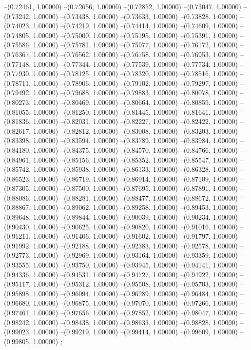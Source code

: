 --(0.72461, 1.00000)
--(0.72656, 1.00000)
--(0.72852, 1.00000)
--(0.73047, 1.00000)
--(0.73242, 1.00000)
--(0.73438, 1.00000)
--(0.73633, 1.00000)
--(0.73828, 1.00000)
--(0.74023, 1.00000)
--(0.74219, 1.00000)
--(0.74414, 1.00000)
--(0.74609, 1.00000)
--(0.74805, 1.00000)
--(0.75000, 1.00000)
--(0.75195, 1.00000)
--(0.75391, 1.00000)
--(0.75586, 1.00000)
--(0.75781, 1.00000)
--(0.75977, 1.00000)
--(0.76172, 1.00000)
--(0.76367, 1.00000)
--(0.76562, 1.00000)
--(0.76758, 1.00000)
--(0.76953, 1.00000)
--(0.77148, 1.00000)
--(0.77344, 1.00000)
--(0.77539, 1.00000)
--(0.77734, 1.00000)
--(0.77930, 1.00000)
--(0.78125, 1.00000)
--(0.78320, 1.00000)
--(0.78516, 1.00000)
--(0.78711, 1.00000)
--(0.78906, 1.00000)
--(0.79102, 1.00000)
--(0.79297, 1.00000)
--(0.79492, 1.00000)
--(0.79688, 1.00000)
--(0.79883, 1.00000)
--(0.80078, 1.00000)
--(0.80273, 1.00000)
--(0.80469, 1.00000)
--(0.80664, 1.00000)
--(0.80859, 1.00000)
--(0.81055, 1.00000)
--(0.81250, 1.00000)
--(0.81445, 1.00000)
--(0.81641, 1.00000)
--(0.81836, 1.00000)
--(0.82031, 1.00000)
--(0.82227, 1.00000)
--(0.82422, 1.00000)
--(0.82617, 1.00000)
--(0.82812, 1.00000)
--(0.83008, 1.00000)
--(0.83203, 1.00000)
--(0.83398, 1.00000)
--(0.83594, 1.00000)
--(0.83789, 1.00000)
--(0.83984, 1.00000)
--(0.84180, 1.00000)
--(0.84375, 1.00000)
--(0.84570, 1.00000)
--(0.84766, 1.00000)
--(0.84961, 1.00000)
--(0.85156, 1.00000)
--(0.85352, 1.00000)
--(0.85547, 1.00000)
--(0.85742, 1.00000)
--(0.85938, 1.00000)
--(0.86133, 1.00000)
--(0.86328, 1.00000)
--(0.86523, 1.00000)
--(0.86719, 1.00000)
--(0.86914, 1.00000)
--(0.87109, 1.00000)
--(0.87305, 1.00000)
--(0.87500, 1.00000)
--(0.87695, 1.00000)
--(0.87891, 1.00000)
--(0.88086, 1.00000)
--(0.88281, 1.00000)
--(0.88477, 1.00000)
--(0.88672, 1.00000)
--(0.88867, 1.00000)
--(0.89062, 1.00000)
--(0.89258, 1.00000)
--(0.89453, 1.00000)
--(0.89648, 1.00000)
--(0.89844, 1.00000)
--(0.90039, 1.00000)
--(0.90234, 1.00000)
--(0.90430, 1.00000)
--(0.90625, 1.00000)
--(0.90820, 1.00000)
--(0.91016, 1.00000)
--(0.91211, 1.00000)
--(0.91406, 1.00000)
--(0.91602, 1.00000)
--(0.91797, 1.00000)
--(0.91992, 1.00000)
--(0.92188, 1.00000)
--(0.92383, 1.00000)
--(0.92578, 1.00000)
--(0.92773, 1.00000)
--(0.92969, 1.00000)
--(0.93164, 1.00000)
--(0.93359, 1.00000)
--(0.93555, 1.00000)
--(0.93750, 1.00000)
--(0.93945, 1.00000)
--(0.94141, 1.00000)
--(0.94336, 1.00000)
--(0.94531, 1.00000)
--(0.94727, 1.00000)
--(0.94922, 1.00000)
--(0.95117, 1.00000)
--(0.95312, 1.00000)
--(0.95508, 1.00000)
--(0.95703, 1.00000)
--(0.95898, 1.00000)
--(0.96094, 1.00000)
--(0.96289, 1.00000)
--(0.96484, 1.00000)
--(0.96680, 1.00000)
--(0.96875, 1.00000)
--(0.97070, 1.00000)
--(0.97266, 1.00000)
--(0.97461, 1.00000)
--(0.97656, 1.00000)
--(0.97852, 1.00000)
--(0.98047, 1.00000)
--(0.98242, 1.00000)
--(0.98438, 1.00000)
--(0.98633, 1.00000)
--(0.98828, 1.00000)
--(0.99023, 1.00000)
--(0.99219, 1.00000)
--(0.99414, 1.00000)
--(0.99609, 1.00000)
--(0.99805, 1.00000)
;
